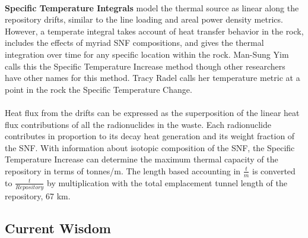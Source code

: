 \paragraph{}
\textbf{Specific Temperature Integrals} model the thermal source as linear along the repository 
drifts, similar to the line loading and areal power density metrics. However, a temperate integral 
takes account of heat transfer behavior in the rock, includes the effects of myriad SNF 
compositions, and gives the thermal integration over time for any specific location within the rock. 
Man-Sung Yim calls this the Specific Temperature Increase method\cite{YimSTI} though other 
researchers have other names for this method. Tracy Radel calls her temperature metric at a point in 
the rock the Specific Temperature Change.\cite{radel_repository_2007}
\paragraph{}
Heat flux from the drifts can be expressed as the superposition of the linear heat flux 
contributions of all the radionuclides in the waste. Each radionuclide contributes in proportion to 
its decay heat generation and its weight fraction of the SNF. With information about isotopic 
composition of the SNF, the Specific Temperature Increase can determine the maximum thermal capacity 
of the repository in terms of tonnes/m. The length based accounting in $\frac{t}{m}$ is converted to 
$\frac{t}{Repository}$ by multiplication with the total emplacement tunnel length of the repository, 
67 km.
\subsection{Current Wisdom}
